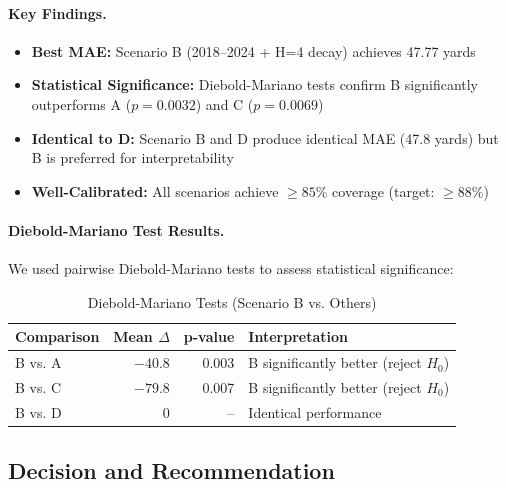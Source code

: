 \paragraph{Key Findings.}
\begin{itemize}
    \item \textbf{Best MAE:} Scenario B (2018--2024 + H=4 decay) achieves 47.77 yards
    \item \textbf{Statistical Significance:} Diebold-Mariano tests confirm B significantly outperforms A ($p = 0.0032$) and C ($p = 0.0069$)
    \item \textbf{Identical to D:} Scenario B and D produce identical MAE (47.8 yards) but B is preferred for interpretability
    \item \textbf{Well-Calibrated:} All scenarios achieve $\geq 85\%$ coverage (target: $\geq 88\%$)
\end{itemize}

\paragraph{Diebold-Mariano Test Results.}
We used pairwise Diebold-Mariano tests to assess statistical significance:

\begin{table}[htbp]
\centering
\caption{Diebold-Mariano Tests (Scenario B vs. Others)}
\label{tab:dm_tests}
\begin{tabular}{lrrp{5cm}}
\toprule
\textbf{Comparison} & \textbf{Mean $\Delta$} & \textbf{p-value} & \textbf{Interpretation} \\
\midrule
B vs. A & $-40.8$ & 0.003 & B significantly better (reject $H_0$) \\
B vs. C & $-79.8$ & 0.007 & B significantly better (reject $H_0$) \\
B vs. D & $0$ & -- & Identical performance \\
\bottomrule
\end{tabular}
\end{table}

\subsection{Decision and Recommendation}

